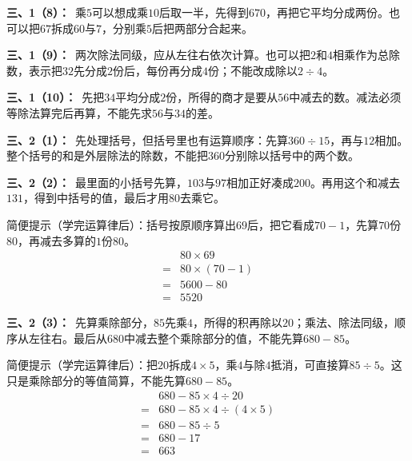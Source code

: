 \documentclass[multi=snippet,border=0pt]{standalone}
\newenvironment{snippet}[3]{\begin{minipage}{#1bp}\color{answerred}\fontsize{#2}{#3}\selectfont\raggedright}{\end{minipage}}
\begin{document}
\begin{snippet}{505}{11.5}{14}\textbf{三、1（8）：}\ 乘\(5\)可以想成乘\(10\)后取一半，先得到\(670\)，再把它平均分成两份。也可以把\(67\)拆成\(60\)与\(7\)，分别乘\(5\)后把两部分合起来。\end{snippet}
\begin{snippet}{505}{11.5}{14}\textbf{三、1（9）：}\ 两次除法同级，应从左往右依次计算。也可以把\(2\)和\(4\)相乘作为总除数，表示把\(32\)先分成\(2\)份后，每份再分成\(4\)份；不能改成除以\(2\div4\)。\end{snippet}
\begin{snippet}{505}{11.5}{14}\textbf{三、1（10）：}\ 先把\(34\)平均分成\(2\)份，所得的商才是要从\(56\)中减去的数。减法必须等除法算完后再算，不能先求\(56\)与\(34\)的差。\end{snippet}
\begin{snippet}{505}{11.5}{14}\textbf{三、2（1）：}\ 先处理括号，但括号里也有运算顺序：先算\(360\div15\)，再与\(12\)相加。整个括号的和是外层除法的除数，不能把\(360\)分别除以括号中的两个数。\end{snippet}
\begin{snippet}{505}{11.5}{14}\textbf{三、2（2）：}\ 最里面的小括号先算，\(103\)与\(97\)相加正好凑成\(200\)。再用这个和减去\(131\)，得到中括号的值，最后才用\(80\)去乘它。\par 简便提示（学完运算律后）：括号按原顺序算出\(69\)后，把它看成\(70-1\)，先算\(70\)份\(80\)，再减去多算的\(1\)份\(80\)。\[\begin{aligned}&80\times69\\={}&80\times(70-1)\\={}&5600-80\\={}&5520\end{aligned}\]\end{snippet}
\begin{snippet}{505}{11.5}{14}\textbf{三、2（3）：}\ 先算乘除部分，\(85\)先乘\(4\)，所得的积再除以\(20\)；乘法、除法同级，顺序从左往右。最后从\(680\)中减去整个乘除部分的值，不能先算\(680-85\)。\par 简便提示（学完运算律后）：把\(20\)拆成\(4\times5\)，乘\(4\)与除\(4\)抵消，可直接算\(85\div5\)。这只是乘除部分的等值简算，不能先算\(680-85\)。\[\begin{aligned}&680-85\times4\div20\\={}&680-85\times4\div(4\times5)\\={}&680-85\div5\\={}&680-17\\={}&663\end{aligned}\]\end{snippet}
\end{document}
